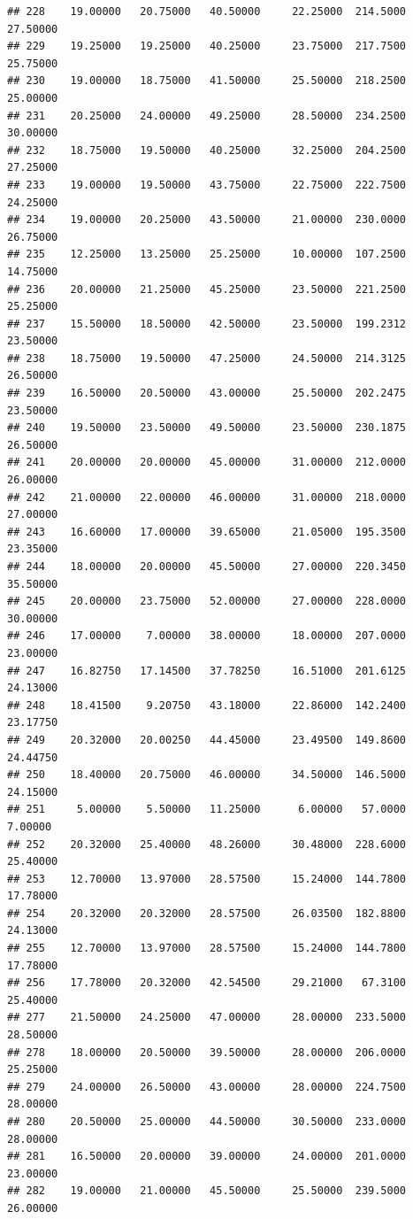 \documentclass[]{article}
\begin{document}
\begin{verbatim}
## 228    19.00000   20.75000   40.50000     22.25000  214.5000    27.50000
## 229    19.25000   19.25000   40.25000     23.75000  217.7500    25.75000
## 230    19.00000   18.75000   41.50000     25.50000  218.2500    25.00000
## 231    20.25000   24.00000   49.25000     28.50000  234.2500    30.00000
## 232    18.75000   19.50000   40.25000     32.25000  204.2500    27.25000
## 233    19.00000   19.50000   43.75000     22.75000  222.7500    24.25000
## 234    19.00000   20.25000   43.50000     21.00000  230.0000    26.75000
## 235    12.25000   13.25000   25.25000     10.00000  107.2500    14.75000
## 236    20.00000   21.25000   45.25000     23.50000  221.2500    25.25000
## 237    15.50000   18.50000   42.50000     23.50000  199.2312    23.50000
## 238    18.75000   19.50000   47.25000     24.50000  214.3125    26.50000
## 239    16.50000   20.50000   43.00000     25.50000  202.2475    23.50000
## 240    19.50000   23.50000   49.50000     23.50000  230.1875    26.50000
## 241    20.00000   20.00000   45.00000     31.00000  212.0000    26.00000
## 242    21.00000   22.00000   46.00000     31.00000  218.0000    27.00000
## 243    16.60000   17.00000   39.65000     21.05000  195.3500    23.35000
## 244    18.00000   20.00000   45.50000     27.00000  220.3450    35.50000
## 245    20.00000   23.75000   52.00000     27.00000  228.0000    30.00000
## 246    17.00000    7.00000   38.00000     18.00000  207.0000    23.00000
## 247    16.82750   17.14500   37.78250     16.51000  201.6125    24.13000
## 248    18.41500    9.20750   43.18000     22.86000  142.2400    23.17750
## 249    20.32000   20.00250   44.45000     23.49500  149.8600    24.44750
## 250    18.40000   20.75000   46.00000     34.50000  146.5000    24.15000
## 251     5.00000    5.50000   11.25000      6.00000   57.0000     7.00000
## 252    20.32000   25.40000   48.26000     30.48000  228.6000    25.40000
## 253    12.70000   13.97000   28.57500     15.24000  144.7800    17.78000
## 254    20.32000   20.32000   28.57500     26.03500  182.8800    24.13000
## 255    12.70000   13.97000   28.57500     15.24000  144.7800    17.78000
## 256    17.78000   20.32000   42.54500     29.21000   67.3100    25.40000
## 277    21.50000   24.25000   47.00000     28.00000  233.5000    28.50000
## 278    18.00000   20.50000   39.50000     28.00000  206.0000    25.25000
## 279    24.00000   26.50000   43.00000     28.00000  224.7500    28.00000
## 280    20.50000   25.00000   44.50000     30.50000  233.0000    28.00000
## 281    16.50000   20.00000   39.00000     24.00000  201.0000    23.00000
## 282    19.00000   21.00000   45.50000     25.50000  239.5000    26.00000

\end{verbatim}
\end{document}
